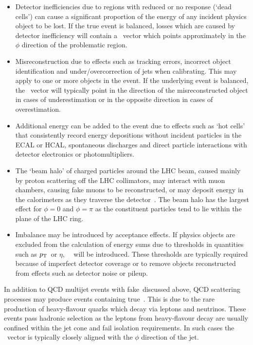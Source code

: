 \begin{itemize}
\item Detector inefficiencies due to regions with reduced or no response (`dead cells') can cause 
a significant proportion of the energy of any incident physics object to be lost. If the true event 
is balanced, losses which are caused by detector inefficiency will contain a \met~vector which points 
approximately in the $\phi$ direction of the problematic region.
\item Misreconstruction due to effects such as tracking errors, incorrect object identification and
under/overcorrection of jets when calibrating. This may apply to one or more objects in the event. 
If the underlying event is balanced, the \met~vector will typically point in 
the direction of the misreconstructed object in cases of underestimation 
or in the opposite direction in cases of overestimation.
\item Additional energy can be added to the event due to effects such as `hot cells' that 
consistently record energy depositions without incident particles in the ECAL or HCAL, 
spontaneous discharges and direct particle interactions with detector
electronics or photomultipliers.
\item The `beam halo' of charged particles around the LHC beam, caused mainly 
by proton scattering off the LHC collimators, may interact with muon chambers, causing fake muons to be 
reconstructed, or may deposit energy in the calorimeters as they traverse the detector~\cite{beam_halo}. The beam halo has the largest 
effect for $\phi = 0$ and $\phi=\pi$ as the constituent particles tend to lie within the plane of the LHC ring.
\item Imbalance may be introduced by acceptance effects. If physics objects are excluded from the calculation
of energy sums due to thresholds in quantities such as ${p_{\text T}}$~or $\eta$, ~\met~will be introduced. These thresholds are typically 
required because of imperfect detector coverage or to remove objects reconstructed from effects such as detector 
noise or pileup.
\end{itemize}
In addition to QCD multijet events with fake~\met discussed above, QCD scattering processes 
may produce events containing true~\met. This is due to the rare production of heavy-flavour 
quarks which decay via leptons and neutrinos. These events pass hadronic selection as the leptons from 
heavy-flavour decay are usually confined within the jet cone and fail isolation requirements. 
In such cases the \met~vector is typically closely aligned with the $\phi$ direction of the jet.

